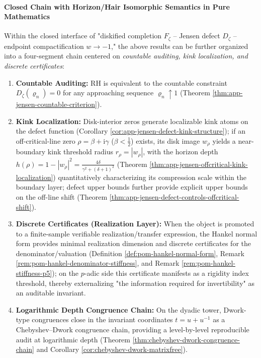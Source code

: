 \paragraph{Closed Chain with Horizon/Hair Isomorphic Semantics in Pure Mathematics}\label{par:app-jensen-horizon-hair-closed-chain}
Within the closed interface of "diskified completion \(F_{\zeta}\) -- Jensen defect \(D_{\zeta}\) -- endpoint compactification \(w\to-1\)," the above results can be further organized into a four-segment chain centered on \emph{countable auditing, kink localization, and discrete certificates}:
\begin{enumerate}
  \item \textbf{Countable Auditing:} RH is equivalent to the countable constraint \(D_{\zeta}(\varrho_n)=0\) for any approaching sequence \(\varrho_n\uparrow 1\) (Theorem \ref{thm:app-jensen-countable-criterion}).
  \item \textbf{Kink Localization:} Disk-interior zeros generate localizable kink atoms on the defect function (Corollary \ref{cor:app-jensen-defect-kink-structure});
  if an off-critical-line zero \(\rho=\beta+\mathrm{i}\gamma\) (\(\beta<\tfrac12\)) exists, its disk image \(w_{\rho}\) yields a near-boundary kink threshold radius \(r_{\rho}=|w_{\rho}|\), with the horizon depth
  \(h(\rho)=1-|w_{\rho}|^{2}=\frac{4\delta}{\gamma^{2}+(\delta+1)^{2}}\) (Theorem \ref{thm:app-jensen-offcritical-kink-localization})
  quantitatively characterizing its compression scale within the boundary layer; defect upper bounds further provide explicit upper bounds on the off-line shift (Theorem \ref{thm:app-jensen-defect-controls-offcritical-shift}).
  \item \textbf{Discrete Certificates (Realization Layer):} When the object is promoted to a finite-sample verifiable realization/transfer expression, the Hankel normal form provides minimal realization dimension and discrete certificates for the denominator/valuation (Definition \ref{def:pom-hankel-normal-form}, Remark \ref{rem:pom-hankel-denominator-stiffness}, and Remark \ref{rem:pom-hankel-stiffness-p5});
  on the \(p\)-adic side this certificate manifests as a rigidity index threshold, thereby externalizing "the information required for invertibility" as an auditable invariant.
  \item \textbf{Logarithmic Depth Congruence Chain:} On the dyadic tower, Dwork-type congruences close in the invariant coordinates \(t=u+u^{-1}\) as a Chebyshev--Dwork congruence chain, providing a level-by-level reproducible audit at logarithmic depth (Theorem \ref{thm:chebyshev-dwork-congruence-chain} and Corollary \ref{cor:chebyshev-dwork-matrixfree}).
\end{enumerate}


